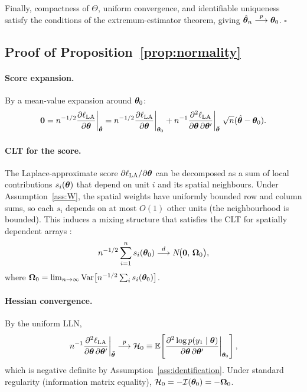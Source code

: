 Finally, compactness of $\Theta$, uniform convergence, and identifiable uniqueness satisfy the conditions of the extremum-estimator theorem, giving $\hat{\boldsymbol{\theta}}_n \overset{p}{\longrightarrow} \boldsymbol{\theta}_0$.
\hfill$\square$

\subsection{Proof of Proposition~\ref{prop:normality}}\label{app:proof_normality}

\paragraph{Score expansion.}
By a mean-value expansion around $\boldsymbol{\theta}_0$:
\[
  \mathbf{0} = n^{-1/2}\frac{\partial\ell_{\mathrm{LA}}}{\partial\boldsymbol{\theta}}\bigg|_{\hat{\boldsymbol{\theta}}}
  = n^{-1/2}\frac{\partial\ell_{\mathrm{LA}}}{\partial\boldsymbol{\theta}}\bigg|_{\boldsymbol{\theta}_0}
  + n^{-1}\frac{\partial^2\ell_{\mathrm{LA}}}{\partial\boldsymbol{\theta}\,\partial\boldsymbol{\theta}'}\bigg|_{\bar{\boldsymbol{\theta}}}\;
  \sqrt{n}(\hat{\boldsymbol{\theta}} - \boldsymbol{\theta}_0).
\]

\paragraph{CLT for the score.}
The Laplace-approximate score $\partial\ell_{\mathrm{LA}}/\partial\boldsymbol{\theta}$ can be decomposed as a sum of local contributions $s_i(\boldsymbol{\theta})$ that depend on unit $i$ and its spatial neighbours.
Under Assumption~\ref{ass:W}, the spatial weights have uniformly bounded row and column sums, so each $s_i$ depends on at most $O(1)$ other units (the neighbourhood is bounded).
This induces a mixing structure that satisfies the CLT for spatially dependent arrays \citep[see][Theorem~3.1]{lee2004}:
\[
  n^{-1/2}\sum_{i=1}^n s_i(\boldsymbol{\theta}_0) \overset{d}{\longrightarrow} N\!\bigl(\mathbf{0},\,\boldsymbol{\Omega}_0\bigr),
\]
where $\boldsymbol{\Omega}_0 = \lim_{n\to\infty} \mathrm{Var}\bigl[n^{-1/2}\sum_i s_i(\boldsymbol{\theta}_0)\bigr]$.

\paragraph{Hessian convergence.}
By the uniform LLN,
\[
  n^{-1}\frac{\partial^2\ell_{\mathrm{LA}}}{\partial\boldsymbol{\theta}\,\partial\boldsymbol{\theta}'}\bigg|_{\bar{\boldsymbol{\theta}}}
  \overset{p}{\longrightarrow} \mathcal{H}_0 \equiv \mathbb{E}\!\left[\frac{\partial^2 \log p(y_1\mid\boldsymbol{\theta})}{\partial\boldsymbol{\theta}\,\partial\boldsymbol{\theta}'}\bigg|_{\boldsymbol{\theta}_0}\right],
\]
which is negative definite by Assumption~\ref{ass:identification}.
Under standard regularity (information matrix equality), $\mathcal{H}_0 = -\mathcal{I}(\boldsymbol{\theta}_0) = -\boldsymbol{\Omega}_0$.

